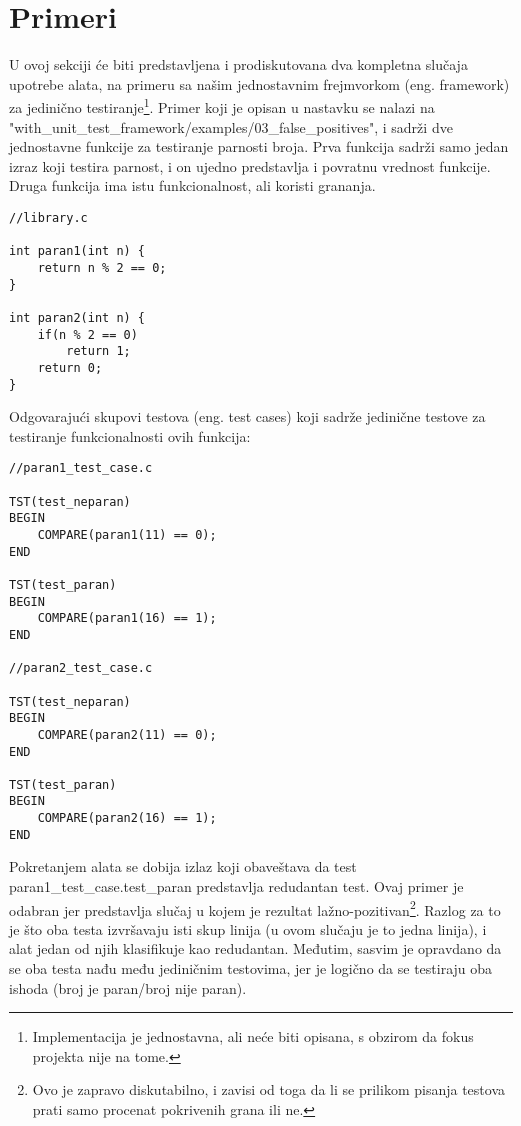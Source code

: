 \documentclass[a4paper]{article}
\begin{document}
\section{Primeri}
\label{sec:examples}
U ovoj sekciji će biti predstavljena i prodiskutovana dva kompletna slučaja upotrebe alata, na primeru sa našim jednostavnim frejmvorkom (eng. framework) za jedinično testiranje\footnote{Implementacija je jednostavna, ali neće biti opisana, s obzirom da fokus projekta nije na tome.}. Primer koji je opisan u nastavku se nalazi na "with\_unit\_test\_framework/examples/03\_false\_positives", i sadrži dve jednostavne funkcije za testiranje parnosti broja. Prva funkcija sadrži samo jedan izraz koji testira parnost, i on ujedno predstavlja i povratnu vrednost funkcije. Druga funkcija ima istu funkcionalnost, ali koristi grananja.

\begin{lstlisting}
//library.c

int paran1(int n) {
    return n % 2 == 0;
}

int paran2(int n) {
    if(n % 2 == 0)
        return 1;
    return 0;
}
\end{lstlisting}

Odgovarajući skupovi testova (eng. test cases) koji sadrže jedinične testove za testiranje funkcionalnosti ovih funkcija:

\begin{lstlisting}
//paran1_test_case.c

TST(test_neparan)
BEGIN
	COMPARE(paran1(11) == 0);
END

TST(test_paran)
BEGIN
	COMPARE(paran1(16) == 1);
END

//paran2_test_case.c

TST(test_neparan)
BEGIN
	COMPARE(paran2(11) == 0);
END

TST(test_paran)
BEGIN
	COMPARE(paran2(16) == 1);
END

\end{lstlisting}

Pokretanjem alata se dobija izlaz koji obaveštava da test paran1\_test\_case.test\_paran predstavlja redudantan test. Ovaj primer je odabran jer predstavlja slučaj u kojem je rezultat lažno-pozitivan\footnote{Ovo je zapravo diskutabilno, i zavisi od toga da li se prilikom pisanja testova prati samo procenat pokrivenih grana ili ne.}. Razlog za to je što oba testa izvršavaju isti skup linija (u ovom slučaju je to jedna linija), i alat jedan od njih klasifikuje kao redudantan. Međutim, sasvim je opravdano da se oba testa nađu među jediničnim testovima, jer je logično da se testiraju oba ishoda (broj je paran/broj nije paran).
\end{document}
